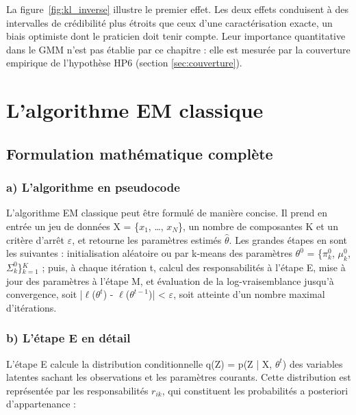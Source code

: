 La figure~\ref{fig:kl_inverse} illustre le premier effet. Les deux effets conduisent à des intervalles de crédibilité plus étroits que ceux d'une caractérisation exacte, un biais optimiste dont le praticien doit tenir compte. Leur importance quantitative dans le GMM n'est pas établie par ce chapitre : elle est mesurée par la couverture empirique de l'hypothèse HP6 (section \ref{sec:couverture}).



\section{L'algorithme EM classique}\label{sec:em_classique}
\subsection{Formulation mathématique complète}\label{sec:formulation_mathematique_complete}
\subsubsection{a) L'algorithme en pseudocode}\label{sec:a_l_algorithme_en_pseudocode}
L'algorithme EM classique peut être formulé de manière concise. Il prend en entrée un jeu de données X = \{$x_{1}$, \ldots{}, $x_{N}$\}, un nombre de composantes K et un critère d'arrêt $\varepsilon $, et retourne les paramètres estimés $\hat{\theta }$. Les grandes étapes en sont les suivantes : initialisation aléatoire ou par k-means des paramètres $\theta ^{0}$ = \{$\pi _{k}^{0}$, $\mu _{k}^{0}$, $\Sigma _{k}^{0}$\}$_{k=1}^{K}$ ; puis, à chaque itération t, calcul des responsabilités à l'étape E, mise à jour des paramètres à l'étape M, et évaluation de la log-vraisemblance jusqu'à convergence, soit |$\ell $($\theta ^{t}$) - $\ell $($\theta ^{t-1}$)| < $\varepsilon $, soit atteinte d'un nombre maximal d'itérations.

\subsubsection{b) L'étape E en détail}\label{sec:b_l_etape_e_en}
L'étape E calcule la distribution conditionnelle q(Z) = p(Z | X, $\theta ^{t}$) des variables latentes sachant les observations et les paramètres courants. Cette distribution est représentée par les responsabilités $r_{ik}$, qui constituent les probabilités a posteriori d'appartenance :


